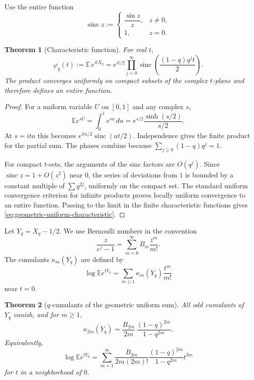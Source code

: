\documentclass[11pt,oneside,openany]{book}
\newtheorem{theorem}{Theorem}[chapter]
\theoremstyle{definition}
\theoremstyle{remark}
\begin{document}
Use the entire function
\[
 \operatorname{sinc}z:=
 \begin{cases}
  \dfrac{\sin z}{z},&z\ne0,\\
  1,&z=0.
 \end{cases}
\]

\begin{theorem}[Characteristic function]\label{thm:geometric-uniform-characteristic}
For real $t$,
\begin{equation}\label{eq:geometric-uniform-characteristic}
 \varphi_q(t):=\mathbb E\,e^{itX_q}
 =e^{it/2}\prod_{j=0}^{\infty}
 \operatorname{sinc}\!\left(\frac{(1-q)q^jt}{2}\right).
\end{equation}
The product converges uniformly on compact subsets of the complex $t$-plane and therefore defines an entire function.
\end{theorem}

\begin{proof}
For a uniform variable $U$ on $[0,1]$ and any complex $s$,
\[
 \mathbb Ee^{sU}=\int_0^1e^{su}\,du
 =e^{s/2}\frac{\sinh(s/2)}{s/2}.
\]
At $s=ita$ this becomes
$e^{ita/2}\operatorname{sinc}(at/2)$.  Independence gives the finite product for the partial sum.  The phases combine because
$\sum_{j\ge0}(1-q)q^j=1$.

For compact $t$-sets, the arguments of the sinc factors are $O(q^j)$.  Since
$\operatorname{sinc}z=1+O(z^2)$ near $0$, the series of deviations from $1$ is bounded by a constant multiple of $\sum q^{2j}$, uniformly on the compact set.  The standard uniform convergence criterion for infinite products proves locally uniform convergence to an entire function.  Passing to the limit in the finite characteristic functions gives \eqref{eq:geometric-uniform-characteristic}.
\end{proof}

Let $Y_q=X_q-1/2$.  We use Bernoulli numbers in the convention
\begin{equation}\label{eq:bernoulli-convention-fabius}
 \frac{z}{e^z-1}=\sum_{m=0}^{\infty}B_m\frac{z^m}{m!}.
\end{equation}
The cumulants $\kappa_m(Y_q)$ are defined by
\[
 \log\mathbb Ee^{tY_q}
 =\sum_{m\ge1}\kappa_m(Y_q)\frac{t^m}{m!}
\]
near $t=0$.

\begin{theorem}[$q$-cumulants of the geometric uniform sum]\label{thm:q-cumulants-uniform}
All odd cumulants of $Y_q$ vanish, and for $m\ge1$,
\begin{equation}\label{eq:q-cumulants-uniform}
 \kappa_{2m}(Y_q)
 =\frac{B_{2m}}{2m}\,
   \frac{(1-q)^{2m}}{1-q^{2m}}.
\end{equation}
Equivalently,
\begin{equation}\label{eq:q-cumulant-log-mgf}
 \log\mathbb Ee^{tY_q}
 =\sum_{m=1}^{\infty}
   \frac{B_{2m}}{2m(2m)!}
   \frac{(1-q)^{2m}}{1-q^{2m}}t^{2m}
\end{equation}
for $t$ in a neighborhood of $0$.
\end{theorem}
\end{document}

